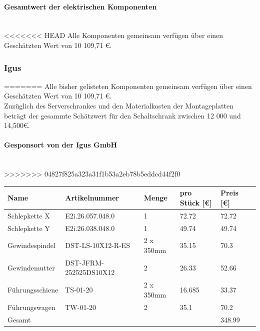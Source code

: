 \paragraph{Gesamtwert der elektrischen Komponenten}\mbox{}\\
<<<<<<< HEAD
    Alle Komponenten gemeinsam verfügen über einen Geschätzten Wert von 10 109,71 €.
\newpage

\subsubsection{Igus}
=======
    Alle bisher gelisteten Komponenten gemeinsam verfügen über einen Geschätzten Wert von 10 109,71 €.\\ 
    Zuzüglich des Serverschrankes und den Materialkosten der Montageplatten beträgt der gesammte Schätzwert für den Schaltschrank zwischen 12 000 und 14,500€.
\paragraph{Gesponsort von der Igus GmbH}\mbox{}\\
>>>>>>> 04827f825a323a31f1b53a2eb78b5eddcd44f2f0
\begin{table}[H]
    \begin{tabular}{llllll}
    Name                & Artikelnummer          & Menge & pro Stück {[}€{]} & Preis {[}€{]} \\ \hline
    Schlepkette X       & E2i.26.057.048.0       & 1             & 72.72                   & 72.72         \\
    Schlepkette Y       & E2i.26.038.048.0       & 1             & 49.74                   & 49.74         \\
    Gewindespindel      & DST-LS-10X12-R-ES      & 2 x 350mm              & 35.15                   & 70.3          \\
    Gewindemutter       & DST-JFRM-252525DS10X12 & 2             & 26.33                   & 52.66         \\
    Führungsschiene     & TS-01-20               & 2 x 350mm              & 16.685                  & 33.37         \\
    Führungswagen       & TW-01-20               & 2             & 35.1                    & 70.2          \\ \hline
    Gesamt              &                        &               &                         & 348.99       
    \end{tabular}
\end{table}

